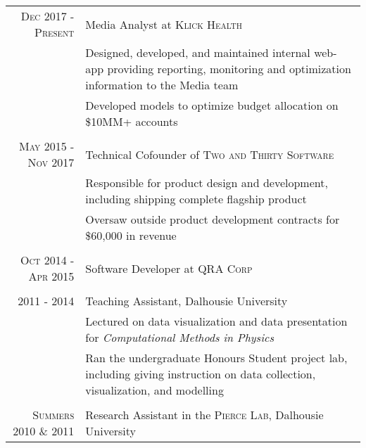 \documentclass[a4paper,11pt]{article} %
\begin{document}
\begin{tabular}{r|p{11cm}}

\textsc{Dec 2017 - Present} & Media Analyst at \textsc{Klick Health} \\
& \footnotesize { Designed, developed, and maintained internal web-app providing reporting, monitoring and optimization information to the Media team } \\
& \footnotesize { Developed models to optimize budget allocation on \$10MM+ accounts } \\
\multicolumn{2}{c}{} \\

\textsc{May 2015 - Nov 2017} & Technical Cofounder of \textsc{Two and Thirty Software} \\
& \footnotesize { Responsible for product design and development, including shipping complete flagship product} \\
& \footnotesize { Oversaw outside product development contracts for \$60,000 in revenue} \\
\multicolumn{2}{c}{} \\

\textsc{Oct 2014 - Apr 2015} & Software Developer at \textsc{QRA Corp}\\
\multicolumn{2}{c}{} \\

\textsc{ 2011 - 2014 } & Teaching Assistant, Dalhousie University \\
& \footnotesize { Lectured on data visualization and data presentation for \emph{Computational Methods in Physics} } \\
& \footnotesize { Ran the undergraduate Honours Student project lab, including giving instruction on data collection, visualization, and modelling } \\

\multicolumn{2}{c}{} \\

\textsc{Summers 2010 \& 2011} & Research Assistant in the \textsc{Pierce Lab}, Dalhousie University  \\


\end{tabular}
\end{document}
